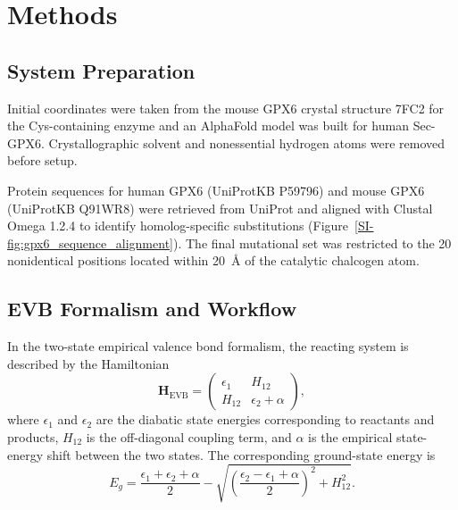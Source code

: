 \section{Methods}

\subsection{System Preparation}

Initial coordinates were taken from the mouse GPX6 crystal structure 7FC2 for the Cys-containing enzyme and an AlphaFold model was built for human Sec-GPX6.\cite{PDB7FC2,jumper2021alphafold} 
Crystallographic solvent and nonessential hydrogen atoms were removed before setup. 

Protein sequences for human GPX6 (UniProtKB P59796) and mouse GPX6 (UniProtKB Q91WR8) were retrieved from UniProt and aligned with Clustal Omega 1.2.4\cite{Sievers2011ClustalOmega} to identify homolog-specific substitutions (Figure~\ref{SI-fig:gpx6_sequence_alignment}). The final mutational set was restricted to the 20 nonidentical positions located within 20~\AA{} of the catalytic chalcogen atom.

\subsection{EVB Formalism and Workflow}

In the two-state empirical valence bond formalism,\cite{warshel_empirical_1980} the reacting system is described by the Hamiltonian
\begin{equation}
\mathbf{H}_{\mathrm{EVB}}=
\begin{pmatrix}
\epsilon_1 & H_{12} \\
H_{12} & \epsilon_2 + \alpha
\end{pmatrix},
\label{eq:evb_hamiltonian}
\end{equation}
where $\epsilon_1$ and $\epsilon_2$ are the diabatic state energies corresponding to reactants and products, $H_{12}$ is the off-diagonal coupling term, and $\alpha$ is the empirical state-energy shift between the two states.\cite{warshel_empirical_1980,oanca_efficient_2023} The corresponding ground-state energy is
\begin{equation}
E_g=\frac{\epsilon_1+\epsilon_2+\alpha}{2}
-\sqrt{\left(\frac{\epsilon_2-\epsilon_1+\alpha}{2}\right)^2+H_{12}^2}.
\label{eq:evb_ground_state}
\end{equation}

